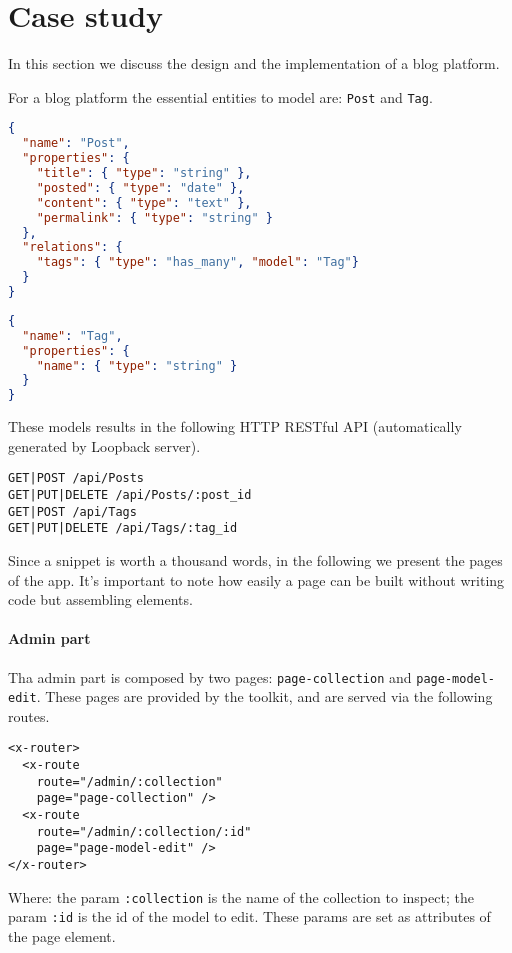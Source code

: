 \section{Case study}\label{sec:case-study}
In this section we discuss the design and the implementation of a blog platform. 

For a blog platform the essential entities to model are: \texttt{Post} and \texttt{Tag}.

\begin{lstlisting}[language=json]
{
  "name": "Post",
  "properties": {
    "title": { "type": "string" },
    "posted": { "type": "date" },
    "content": { "type": "text" },
    "permalink": { "type": "string" }
  }, 
  "relations": {
    "tags": { "type": "has_many", "model": "Tag"}
  }
}
\end{lstlisting}

\begin{lstlisting}[language=json]
{
  "name": "Tag",
  "properties": {
    "name": { "type": "string" }
  }
}
\end{lstlisting}

These models results in the following HTTP RESTful API (automatically generated by Loopback server).

\begin{lstlisting}
GET|POST /api/Posts
GET|PUT|DELETE /api/Posts/:post_id
GET|POST /api/Tags
GET|PUT|DELETE /api/Tags/:tag_id
\end{lstlisting}

Since a snippet is worth a thousand words, in the following we present the pages of the app.
It's important to note how easily a page can be built without writing code but assembling elements. 

\paragraph{Admin part}

Tha admin part is composed by two pages: \texttt{page-collection} and \texttt{page-model-edit}.
These pages are provided by the  toolkit, and are served via the following routes.

\begin{lstlisting}[language=HTML5]
<x-router>
  <x-route 
    route="/admin/:collection" 
    page="page-collection" />
  <x-route 
    route="/admin/:collection/:id"
    page="page-model-edit" />
</x-router>
\end{lstlisting}

Where:
the param \texttt{:collection} is the name of the collection to inspect;
the param \texttt{:id} is the id of the model to edit.
These params are set as attributes of the page element.

